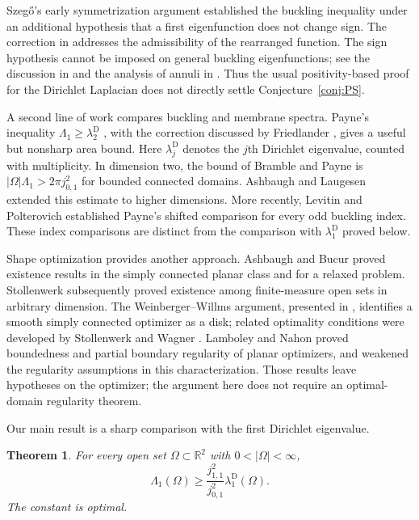 \documentclass[11pt,letterpaper,reqno]{amsart}
\newtheorem{theorem}{Theorem}[section]
\theoremstyle{definition}
\begin{document}
Szeg\H{o}'s early symmetrization argument \cite{Szego50,Szego58}
established the buckling inequality under an additional hypothesis
that a first eigenfunction does not change sign. The correction in
\cite{Szego58} addresses the admissibility of the rearranged function.
The sign hypothesis cannot be imposed on general buckling eigenfunctions;
see the discussion in \cite{AL} and the analysis of annuli in \cite{BP}.
Thus the usual positivity-based proof for the Dirichlet Laplacian does
not directly settle Conjecture~\ref{conj:PS}.

A second line of work compares buckling and membrane spectra. Payne's
inequality $\Lambda_1\ge\lambda_2^{\mathrm D}$ \cite{Payne}, with the
correction discussed by Friedlander \cite{Friedlander}, gives a useful
but nonsharp area bound. Here $\lambda_j^{\mathrm D}$ denotes the
$j$th Dirichlet eigenvalue, counted with multiplicity. In dimension two, the bound of Bramble and
Payne \cite{BramblePayne} is $|\Omega|\Lambda_1>2\pi j_{0,1}^2$ for
bounded connected domains. Ashbaugh and Laugesen \cite{AL} extended this
estimate to higher dimensions. More recently, Levitin and Polterovich
\cite{LP} established Payne's shifted comparison for every odd buckling
index. These index comparisons are distinct from the comparison with
$\lambda_1^{\mathrm D}$ proved below.

Shape optimization provides another approach. Ashbaugh and Bucur
\cite{AB} proved existence results in the simply connected planar class
and for a relaxed problem. Stollenwerk \cite{Stollenwerk} subsequently
proved existence among finite-measure open sets in arbitrary dimension.
The Weinberger--Willms argument, presented in \cite{AB}, identifies a
smooth simply connected optimizer as a disk; related optimality
conditions were developed by Stollenwerk and Wagner \cite{SW}.
Lamboley and Nahon \cite{LN} proved boundedness and partial boundary
regularity of planar optimizers, and weakened the regularity assumptions
in this characterization. Those results leave hypotheses on the
optimizer; the argument here does not require an optimal-domain
regularity theorem.

Our main result is a sharp comparison with the first Dirichlet eigenvalue.
\begin{theorem}\label{main}
For every open set $\Omega\subset\mathbb R^2$ with
$0<|\Omega|<\infty$,
\begin{equation}\label{eq:comparison}
 \Lambda_1(\Omega)\ge
       \frac{j_{1,1}^2}{j_{0,1}^2}\lambda_1^{\mathrm D}(\Omega).
\end{equation}
The constant is optimal.
\end{theorem}
\end{document}
